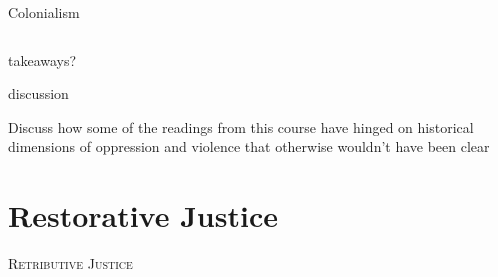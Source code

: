 \documentclass[aspectratio=169,17pt]{beamer} %
\begin{document}
\begin{frame}{Colonialism}
\begin{columns}
\begin{column}{0.7\textwidth}
\end{column}
\end{columns}


\end{frame}


\begin{frame}{takeaways?}
    
\centering

\visible<+->{}


\end{frame}



\begin{frame}{discussion}
    
Discuss how some of the readings from this course have hinged on historical dimensions of oppression and violence that otherwise wouldn't have been clear

\end{frame}






\section{Restorative Justice}

\begin{frame}[plain]

\centering 
{\Large\scshape Retributive Justice}



\end{frame}
\end{document}
